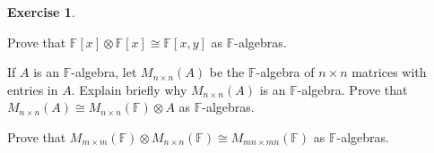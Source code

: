 \documentclass[svgnames]{article}
\theoremstyle{definition}
\newtheorem{Exercise}{Exercise}
\theoremstyle{remark}
\theoremstyle{underline}
\theoremstyle{underline}
\begin{document}
	\begin{Exercise}
		\begin{subquests}
			\item Prove that $\mathbb{F}[x] \otimes \mathbb{F}[x] \cong \mathbb{F}[x,y]$ as $\mathbb{F}$-algebras.
			\item  If $A$ is an $\mathbb{F}$-algebra, let $M_{n \times n}(A)$ be the $\mathbb{F}$-algebra of $n \times n$ matrices with entries in $A$. Explain briefly why $M_{n\times n}(A)$ is an $\mathbb{F}$-algebra. Prove that $M_{n \times n}(A) \cong M_{n \times n}(\mathbb F) \otimes A$ as $\mathbb{F}$-algebras.
			\item  Prove that $M_{m\times m}(\mathbb F) \otimes M_{n\times n}(\mathbb F) \cong M_{mn \times mn}(\mathbb F)$ as $\mathbb F$-algebras.
		\end{subquests}
	\end{Exercise}
\end{document}
